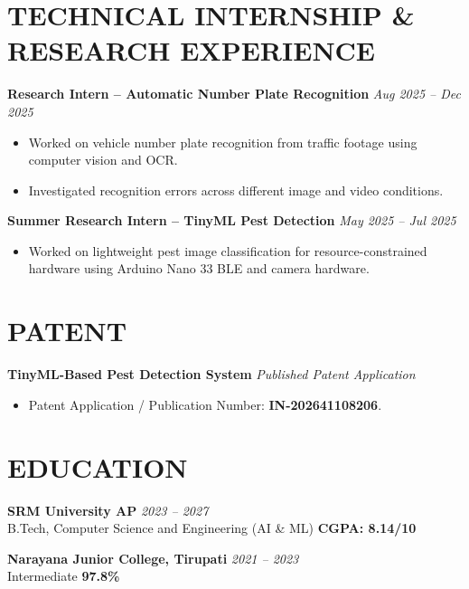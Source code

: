 \documentclass[a4paper,10pt]{article}
\begin{document}
\section*{TECHNICAL INTERNSHIP \& RESEARCH EXPERIENCE}

\textbf{Research Intern -- Automatic Number Plate Recognition}
\hfill
\textit{Aug 2025 -- Dec 2025}

\begin{itemize}
    \item Worked on vehicle number plate recognition from traffic footage using computer vision and OCR.
    \item Investigated recognition errors across different image and video conditions.
\end{itemize}

\textbf{Summer Research Intern -- TinyML Pest Detection}
\hfill
\textit{May 2025 -- Jul 2025}

\begin{itemize}
    \item Worked on lightweight pest image classification for resource-constrained hardware using Arduino Nano 33 BLE and camera hardware.
\end{itemize}

\section*{PATENT}

\textbf{TinyML-Based Pest Detection System}
\hfill
\textit{Published Patent Application}

\begin{itemize}
    \item Patent Application / Publication Number: \textbf{IN-202641108206}.
\end{itemize}

\section*{EDUCATION}

\textbf{SRM University AP}
\hfill
\textit{2023 -- 2027}\\
B.Tech, Computer Science and Engineering (AI \& ML)
\hfill
\textbf{CGPA: 8.14/10}

\textbf{Narayana Junior College, Tirupati}
\hfill
\textit{2021 -- 2023}\\
Intermediate
\hfill
\textbf{97.8\%}
\end{document}
